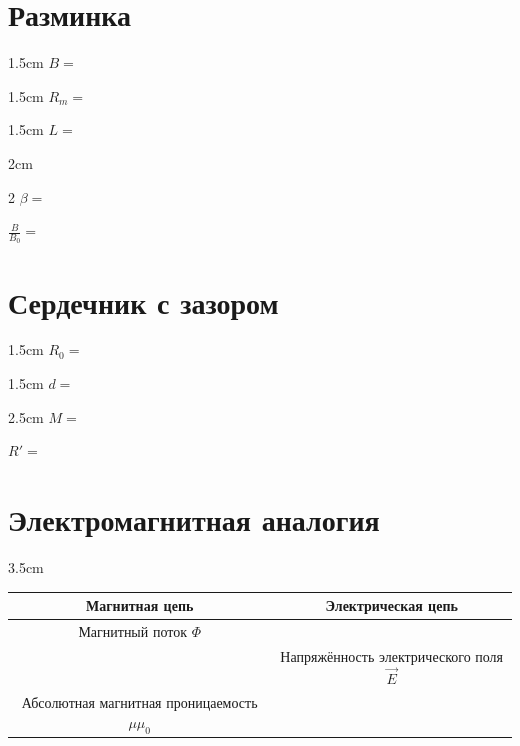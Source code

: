 
\part{Разминка}

\begin{answerbox}{1.5cm}
\(B=\)
\end{answerbox}

\begin{answerbox}{1.5cm}
\(R_m=\)
\end{answerbox}

\begin{answerbox}{1.5cm}
\(L=\)
\end{answerbox}

\begin{answerbox}{2cm}
\begin{multicols}{2}
\(\beta=\)

\columnbreak

\(\frac{B}{B_0}=\)
\end{multicols}
\end{answerbox}

\part{Сердечник с зазором}

\begin{answerbox}{1.5cm}
\(R_0=\)
\end{answerbox}

\begin{answerbox}{1.5cm}
\(d=\)
\end{answerbox}

\begin{answerbox}{2.5cm}
\(M=\)

\bigskip

\(R'=\)
\end{answerbox}

\part{Электромагнитная аналогия}

\begin{answerbox}{3.5cm}
\vspace{-\OlympAnswerGap}
\begin{center}
\begin{tabular}{|c|c|}\hline
\textbf{Магнитная цепь}&\textbf{Электрическая цепь}\\\hline
Магнитный поток \(\Phi\)& \\\hline
& Напряжённость электрического поля \(\vec E\)\\\hline
Абсолютная магнитная проницаемость \(\mu\mu_0\)& \\\hline
\end{tabular}
\end{center}
\end{answerbox}

